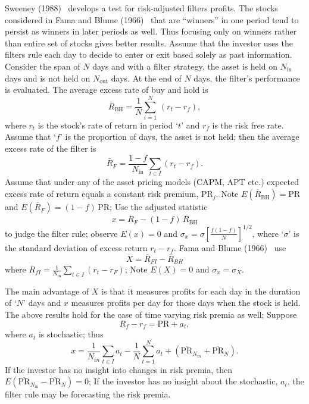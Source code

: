 Sweeney (1988)~\cite{sweet} develops a test for risk-adjusted filters profits. The stocks considered in Fama and Blume (1966)~\cite{famablume} that are ``winners'' in one period tend to persist as winners in later periods as well. Thus focusing only on winners rather than entire set of stocks gives better results. Assume that the investor uses the filters rule each day to decide to enter or exit based solely as past information. Consider the span of $N$ days and with a filter strategy, the asset is held on $N_{\text{in}}$ days and is not held on $N_{\text{out}}$ days. At the end of $N$ days, the filter's performance is evaluated. The average excess rate of buy and hold is
	\[
	\overline{R}_{\text{BH}}=\dfrac{1}{N} \sum_{i=1}^N \, (r_t - r_f ),
	\]
where $r_t$ is the stock's rate of return in period `$t$' and $r_f$ is the risk free rate. Assume that `$f$' is the proportion of days, the asset is not held; then the average excess rate of the filter is
	\[
	\overline{R}_{F}=\dfrac{1-f}{N_{\text{in}}} \sum_{t \in I} (r_t - r_f).
	\]
Assume that under any of the asset pricing models (CAPM, APT etc.) expected excess rate of return equals a constant risk premium, $\text{PR}_{j}$. Note $E(\overline{R}_{\text{BH}}) = \text{PR}$ and $E(\overline{R}_{F}) = (1 - f)\,\text{PR}$; Use the adjusted statistic
	\begin{equation} \label{eqn:xbarfirst}
	x= \overline{R}_{F} - (1 - f)\, \overline{R}_{\text{BH}}
	\end{equation}
to judge the filter rule; observe $E(x) = 0$ and $\sigma_{x} = \sigma[\frac{f(1-f)}{N}]^{1/2}$, where `$\sigma$' is the standard deviation of excess return $r_t - r_f$. Fama and Blume (1966)~\cite{famablume} use
	\begin{equation} \label{eqn:bigxbar}
	X = \overline{R}_{FI} - \overline{R}_{BH}
	\end{equation}
where $\overline{R}_{fI} = \frac{1}{N_{\text{in}}} \sum_{t \in I}(r_t - r_F)$; Note $E(X) = 0$ and $\sigma_{x} = \sigma_{X}$.


The main advantage of $X$ is that it measures profits for each day in the duration of `$N$' days and $x$ measures profits per day for those days when the stock is held. The above results hold for the case of time varying risk premia as well; Suppose
	\[
	R_f - r_f = \text{PR} + a_t,
	\]
where $a_t$ is stochastic; thus
	\begin{equation} \label{eqn:anotherxeq}
	x = \dfrac{1}{N_{in}} \sum_{t \in I} a_t - \dfrac{1}{N} \sum_{t=1}^N a_t + (\overline{\text{PR}}_{N_{in} }+\overline{\text{PR}}_N ).
	\end{equation}
If the investor has no insight into changes in risk premia, then $E(\overline{\text{PR}}_{N_{\text{in}}} - \overline{\text{PR}}_{N}) = 0$; If the investor has no insight about the stochastic, $a_t$, the filter rule may be forecasting the risk premia.



